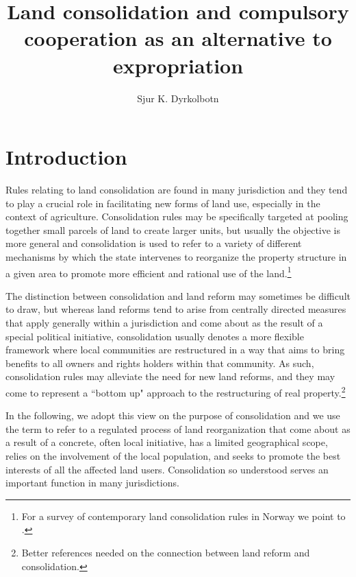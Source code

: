 \documentclass[10pt]{article} %
\title{Land consolidation and compulsory cooperation as an alternative to expropriation}
\author{Sjur K. Dyrkolbotn}
\begin{document}
\maketitle

\section{Introduction}\label{intro}

Rules relating to land consolidation are found in many jurisdiction and they tend to play a crucial role in facilitating new forms of land use, especially in the context of agriculture. Consolidation rules may be specifically targeted at pooling together small parcels of land to create larger units, but usually the objective is more general and consolidation is used to refer to a variety of different mechanisms by which the state intervenes to reorganize the property structure in a given area to promote more efficient and rational use of the land.\footnote{For a survey of contemporary land consolidation rules in Norway we point to \cite{vittikainen2004}.}

The distinction between consolidation and land reform may sometimes be difficult to draw, but whereas land reforms tend to arise from centrally directed measures that apply generally within a jurisdiction and come about as the result of a special political initiative, consolidation usually denotes a more flexible framework where local communities are restructured in a way that aims to bring benefits to all owners and rights holders within that community. As such, consolidation rules may alleviate the need for new land reforms, and they may come to represent a ``bottom up" approach to the restructuring of real property.\footnote{Better references needed on the connection between land reform and consolidation.}

In the following, we adopt this view on the purpose of consolidation and we use the term to refer to a regulated process of land reorganization that come about as a result of a concrete, often local initiative, has a limited geographical scope, relies on the involvement of the local population, and seeks to promote the best interests of all the affected land users. Consolidation so understood serves an important function in many jurisdictions. 
\end{document}
